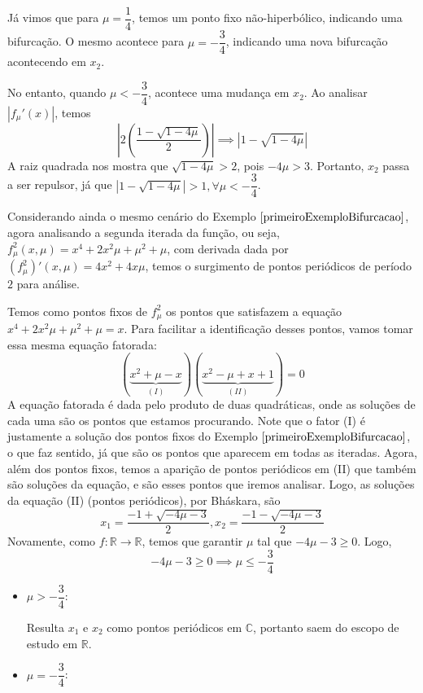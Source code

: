 \documentclass[../IC.tex]{subfiles}
\begin{document}
\begin{exemplo}
\begin{itemize}
			Já vimos que para $\mu = \dfrac{1}{4}$, temos um ponto fixo não-hiperbólico, indicando uma bifurcação. O mesmo acontece para $\mu = -\dfrac{3}{4}$, indicando uma nova bifurcação acontecendo em $x_2$.
			
			No entanto, quando $\mu < -\dfrac{3}{4}$, acontece uma mudança em $x_2$. Ao analisar $|f_\mu'(x)|$, temos
			$$\left|2\left(\dfrac{1-\sqrt{1-4\mu}}{2}\right)\right| \implies |1-\sqrt{1-4\mu}|$$
			A raiz quadrada nos mostra que $\sqrt{1-4\mu} > 2$, pois $-4\mu > 3$. Portanto, $x_2$ passa a ser repulsor, já que $|1-\sqrt{1-4\mu}| > 1, \forall \mu<-\dfrac{3}{4}$.
		\end{itemize}
	\end{exemplo}
	
	\begin{exemplo}
		Considerando ainda o mesmo cenário do Exemplo $\ref{primeiroExemploBifurcacao}$, agora analisando a segunda iterada da função, ou seja, $f_\mu^2(x, \mu) = x^4 + 2x^2\mu+\mu^2+\mu$, com derivada dada por $(f_\mu^2)'(x,\mu)=4x^2+4x\mu$, temos o surgimento de pontos periódicos de período $2$ para análise.
		
		\noindent Temos como pontos fixos de $f_\mu^2$ os pontos que satisfazem a equação $x^4 + 2x^2\mu+\mu^2+\mu = x$. Para facilitar a identificação desses pontos, vamos tomar essa mesma equação fatorada: $$(\underbrace{x^2+\mu-x}_{(I)})(\underbrace{x^2-\mu+x+1}_{(II)})=0$$
		\noindent A equação fatorada é dada pelo produto de duas quadráticas, onde as soluções de cada uma são os pontos que estamos procurando. Note que o fator (I) é justamente a solução dos pontos fixos do Exemplo $\ref{primeiroExemploBifurcacao}$, o que faz sentido, já que são os pontos que aparecem em todas as iteradas. Agora, além dos pontos fixos, temos a aparição de pontos periódicos em (II) que também são soluções da equação, e são esses pontos que iremos analisar. Logo, as soluções da equação (II) (pontos periódicos), por Bháskara, são
		$$x_1=\dfrac{-1+\sqrt{-4\mu-3}}{2},x_2=\dfrac{-1-\sqrt{-4\mu-3}}{2}$$
		Novamente, como $f: \mathbb{R} \rightarrow \mathbb{R}$, temos que garantir $\mu$ tal que $-4\mu-3\geq0$. Logo, 
		$$-4\mu-3\geq0 \implies \mu \leq -\dfrac{3}{4}$$
		
		\begin{itemize}
			\item $\mu > -\dfrac{3}{4}$:
			
			Resulta $x_1$ e $x_2$ como pontos periódicos em $\mathbb{C}$, portanto saem do escopo de estudo em $\mathbb{R}$.			
			\item $\mu = -\dfrac{3}{4}$:
			

\end{itemize}
\end{exemplo}
\end{document}
